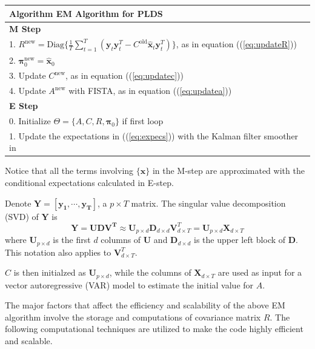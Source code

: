 \documentclass[fleqn]{article}
\let\oldref\ref
\renewcommand{\ref}[1]{(\oldref{#1})}
\newcommand{\T}{T}
\begin{document}
\begin{tabular}{l}
\hline
\textbf{Algorithm } EM Algorithm for PLDS\\
\hline
\textbf{M Step}\\
1. $R^{\text{new}}=\text{Diag}\biggl\{\frac{1}{T}\sum\limits_{t=1}^{T}(\mathbf{y}_t\mathbf{y}_t^{\T}-C^{\text{old}} \hat{\mathbf{x}}_t\mathbf{y}_t^{\T})\biggr\}$, as in equation \ref{eq:updateR}\\
2. $\mathbf{\pi}_0^{\text{new}}=\hat{\mathbf{x}}_0$\\
3. Update $C^{\text{new}}$, as in equation \ref{eq:updatec}\\
4. Update $A^{\text{new}}$ with FISTA, as in equation \ref{eq:updatea}\\
\hline
\textbf{E Step}\\
0. Initialize $\Theta =\{A,C,R,\mathbf{\pi}_0\}$ if first loop\\
1. Update the expectations in \ref{eq:expecs} with the Kalman filter smoother in \nameref{sec:appendix1}\\
\hline
\end{tabular}

Notice that all the terms involving $\{\mathbf{x}\}$ in the M-step are approximated with the conditional expectations calculated in E-step.

Denote $\mathbf{Y} = \left[\mathbf{y_1},\cdots,\mathbf{y_T}\right]$, a $p\times T$ matrix. The singular value decomposition (SVD) of $\mathbf{Y}$ is
\begin{equation}\label{eq:initial}
    \mathbf{Y} = \mathbf{UDV^{\T}} \approx \mathbf{U}_{p \times d} \mathbf{D}_{d \times d} \mathbf{V}_{d \times T}^{\T} =\mathbf{U}_{p\times d}\mathbf{X}_{d \times T}
\end{equation}
where $\mathbf{U}_{p \times d}$ is the first $d$ columns of $\mathbf{U}$ and $\mathbf{D}_{d\times d}$ is the upper left block of $\mathbf{D}$. This notation also applies to $\mathbf{V}^{\T}_{d \times T}$.

$C$ is then initialzed as $\mathbf{U}_{p\times d}$, while the columns of $\mathbf{X}_{d \times T}$ are used as input for a vector autoregressive (VAR) model to estimate the initial value for $A$.

The major factors that affect the efficiency and scalability of the above EM algorithm involve the storage and computations of covariance matrix $R$. The following computational techniques are utilized to make the code highly efficient and scalable.
\end{document}
